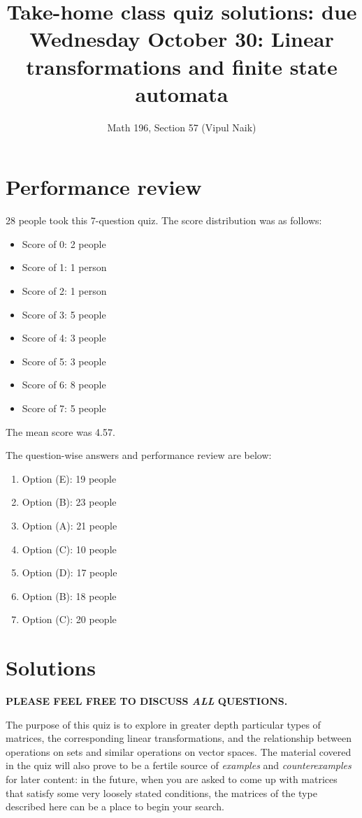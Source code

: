 \documentclass[10pt]{amsart}
\title{Take-home class quiz solutions: due Wednesday October 30: Linear transformations and finite state automata}
\author{Math 196, Section 57 (Vipul Naik)}
\begin{document}
\maketitle

\section{Performance review}

28 people took this 7-question quiz. The score distribution was as follows:

\begin{itemize}
\item Score of 0: 2 people
\item Score of 1: 1 person
\item Score of 2: 1 person
\item Score of 3: 5 people
\item Score of 4: 3 people
\item Score of 5: 3 people
\item Score of 6: 8 people
\item Score of 7: 5 people
\end{itemize}

The mean score was 4.57.

The question-wise answers and performance review are below:

\begin{enumerate}
\item Option (E): 19 people
\item Option (B): 23 people
\item Option (A): 21 people
\item Option (C): 10 people
\item Option (D): 17 people
\item Option (B): 18 people
\item Option (C): 20 people
\end{enumerate}
\section{Solutions}

{\bf PLEASE FEEL FREE TO DISCUSS {\em ALL} QUESTIONS.}

The purpose of this quiz is to explore in greater depth particular
types of matrices, the corresponding linear transformations, and the
relationship between operations on sets and similar operations on
vector spaces. The material covered in the quiz will also prove to be
a fertile source of {\em examples} and {\em counterexamples} for later
content: in the future, when you are asked to come up with matrices
that satisfy some very loosely stated conditions, the matrices of the
type described here can be a place to begin your search.
\end{document}
